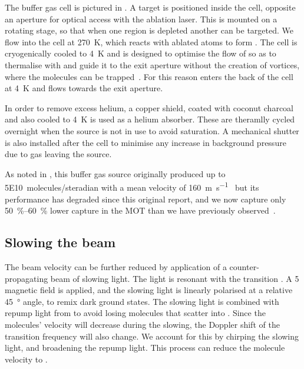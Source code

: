 The buffer gas cell is pictured in . A \Ca{}
target is positioned inside the cell, opposite an aperture for optical access
with the ablation laser. This is mounted on a rotating stage, so that when one
region is depleted another can be targeted. We flow \SFsix{} into the cell at
\SI{270}{\kelvin}, which reacts with ablated \Ca{} atoms to form \CaF{}. The
cell is cryogenically cooled to \SI{4}{\kelvin} and is designed to optimise the
flow of \He{} so as to thermalise with \CaF{} and guide it to the exit aperture
without the creation of vortices, where the molecules can be
trapped~\cite{Truppe2018}. For this reason \He{} enters the back of the cell at
\SI{4}{\kelvin} and flows towards the exit aperture.

\begin{figure}
  \centering
  \caption{}
  \label{overview:fig:source}
\end{figure}

In order to remove excess helium, a copper shield, coated with coconut charcoal
and also cooled to \SI{4}{\kelvin} is used as a helium absorber. These are
theramlly cycled overnight when the source is not in use to avoid saturation.
A mechanical shutter is also installed after the cell to minimise any increase
in background pressure due to \He{} gas leaving the source.

As noted in , this buffer gas source originally
produced up to \SI{5E10}{molecules/steradian} with a mean velocity of
\SI{160}{\meter\per\second}~\cite{Truppe2018} but its performance has degraded
since this original report, and we now capture only \SIrange{50}{60}{\percent}
lower capture in the MOT than we have previously observed~\cite{}.

\subsection*{Slowing the beam}

The beam velocity can be further reduced by application of a counter-propagating
beam of slowing light. The light is resonant with the  transition . A \SI{5}{\gauss} magnetic field is
applied, and the slowing light is linearly polarised at a relative
\SI{45}{\degree} angle, to remix dark ground states. The slowing light is
combined with repump light from 
to avoid losing molecules that scatter into . Since the molecules'
velocity will decrease during the slowing, the Doppler shift of the transition
frequency will also change. We account for this by chirping the slowing light,
and broadening the repump light. This process can reduce the molecule velocity
to .

